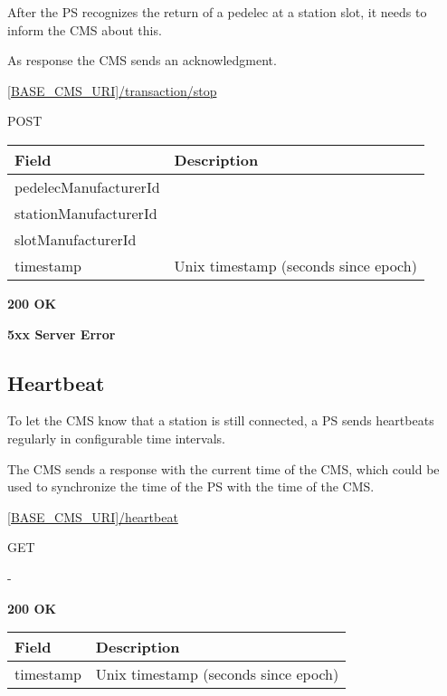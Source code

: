 After the \acs{PS} recognizes the return of a pedelec at a station slot, it needs to inform the \acs{CMS} about this.

As response the \acs{CMS} sends an acknowledgment.

 \url{[BASE_CMS_URI]/transaction/stop}

 POST

\begin{table}[!h]
\vspace{-7mm}
\begin{tabularx}{\linewidth}{ | l | X | }
  \hline
  \rowcolor{table-head}
  Field & Description \\
  \hline
  	pedelecManufacturerId			& \\
  	stationManufacturerId			& \\
  	slotManufacturerId			& \\
  	timestamp					& Unix timestamp (seconds since epoch) \\
  	
    \hline
\end{tabularx}
\end{table}

 \textbf{200 OK}

 \textbf{5xx Server Error}

\subsection{Heartbeat}

To let the \acs{CMS} know that a station is still connected, a \acs{PS} sends heartbeats regularly in configurable time intervals.

The \acs{CMS} sends a response with the current time of the \acs{CMS}, which could be used to synchronize the time of the \acs{PS} with the time of the \acs{CMS}.

 \url{[BASE_CMS_URI]/heartbeat}

 GET

 -

 \textbf{200 OK}

\begin{tabularx}{\linewidth}{ | l | X | }
  \hline
  \rowcolor{table-head}
  Field & Description \\
  \hline
  	timestamp			& Unix timestamp (seconds since epoch) \\	
  \hline
\end{tabularx}


